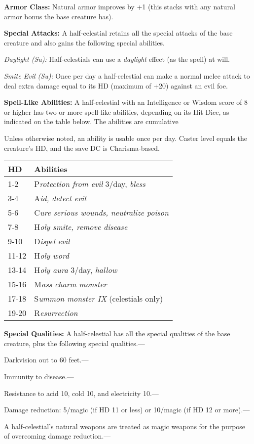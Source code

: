 \documentclass{article}
\begin{document}
\textbf{Armor Class:} Natural armor improves by +1 (this stacks with any natural 
armor bonus the base creature has).

\textbf{Special Attacks:} A half-celestial retains all the special attacks of the 
base creature and also gains the following special abilities. 

\textit{Daylight (Su): }Half-celestials can use a \textit{daylight }effect (as 
the spell) at will.

\textit{Smite Evil (Su): }Once per day a half-celestial can make a normal melee 
attack to deal extra damage equal to its HD (maximum of +20) against an evil foe.

\textbf{Spell-Like Abilities:} A half-celestial with an Intelligence or Wisdom 
score of 8 or higher has two or more spell-like abilities, depending on its Hit 
Dice, as indicated on the table below. The abilities are cumulative

Unless otherwise noted, an ability is usable once per day. Caster level equals 
the creature's HD, and the save DC is Charisma-based.

\begin{tabular}{|>{\raggedright}p{23pt}|>{\raggedright}p{157pt}|}
\hline
H\textbf{D} & A\textbf{bilities}\tabularnewline
\hline
1-2 & P\textit{rotection from evil }3/day, \textit{bless}\tabularnewline
\hline
3-4 & A\textit{id, detect evil}\tabularnewline
\hline
5-6 & C\textit{ure serious wounds, neutralize poison}\tabularnewline
\hline
7-8 & H\textit{oly smite, remove disease}\tabularnewline
\hline
9-10 & D\textit{ispel evil}\tabularnewline
\hline
11-12 & H\textit{oly word}\tabularnewline
\hline
13-14 & H\textit{oly aura }3/day, \textit{hallow}\tabularnewline
\hline
15-16 & M\textit{ass charm monster}\tabularnewline
\hline
17-18 & S\textit{ummon monster IX }(celestials only)\tabularnewline
\hline
19-20 & R\textit{esurrection}\tabularnewline
\hline
\end{tabular}

\textbf{Special Qualities:} A half-celestial has all the special qualities of the 
base creature, plus the following special qualities.---

Darkvision out to 60 feet.---

Immunity to disease.---

Resistance to acid 10, cold 10, and electricity 10.---

Damage reduction: 5/magic (if HD 11 or less) or 10/magic (if HD 12 or more).---

A half-celestial's natural weapons are treated as magic weapons for the purpose 
of overcoming damage reduction.---
\end{document}
